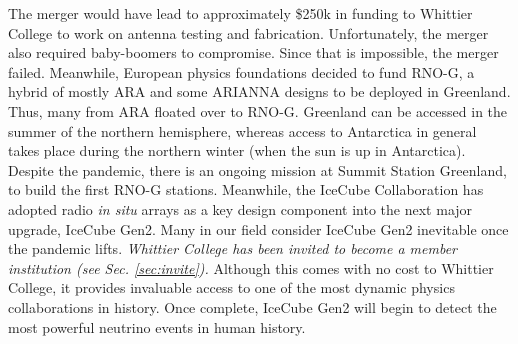 \documentclass[../../../main.tex]{subfiles}
\begin{document}
The merger would have lead to approximately \$250k in funding to Whittier College to work on antenna testing and fabrication.  Unfortunately, the merger also required baby-boomers to compromise.  Since that is impossible, the merger failed.  Meanwhile, European physics foundations decided to fund RNO-G, a hybrid of mostly ARA and some ARIANNA designs to be deployed in Greenland.  Thus, many from ARA floated over to RNO-G.  Greenland can be accessed in the summer of the northern hemisphere, whereas access to Antarctica in general takes place during the northern winter (when the sun is up in Antarctica).  Despite the pandemic, there is an ongoing mission at Summit Station Greenland, to build the first RNO-G stations.  Meanwhile, the IceCube Collaboration has adopted radio \textit{in situ} arrays as a key design component into the next major upgrade, IceCube Gen2.  Many in our field consider IceCube Gen2 inevitable once the pandemic lifts.  \textit{Whittier College has been invited to become a member institution (see Sec. \ref{sec:invite}).}  Although this comes with no cost to Whittier College, it provides invaluable access to one of the most dynamic physics collaborations in history.  Once complete, IceCube Gen2 will begin to detect the most powerful neutrino events in human history.
\end{document}
